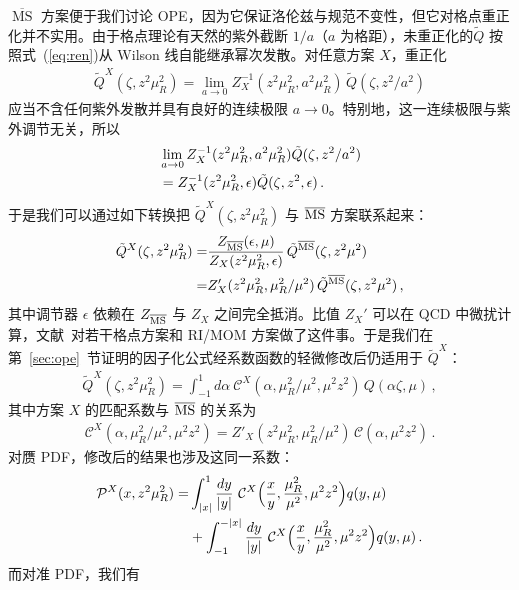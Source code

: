 $\overline{\ensuremath{\operatorname{MS}}}$ 方案便于我们讨论 OPE，因为它保证洛伦兹与规范不变性，但它对格点重正化并不实用。由于格点理论有天然的紫外截断 $1/a$（$a$ 为格距），未重正化的\spcorr $\tilde{Q}$ 按照式~(\ref{eq:ren})从 Wilson 线自能继承幂次发散。对任意方案 $X$，重正化\spcorr
\begin{align}
\tilde{Q}^X(\zeta,z^2\mu^2_R)
  = \lim_{a\to0} Z^{-1}_X(z^2\mu_R^2,a^2\mu^2_R)\, \tilde{Q}(\zeta,z^2/a^2)
\end{align}
应当不含任何紫外发散并具有良好的连续极限 $a\to0$。特别地，这一连续极限与紫外调节无关，所以
\begin{align}
&\lim_{a\to0} Z^{-1}_X(z^2\mu_R^2,a^2\mu^2_R)\tilde{Q}(\zeta,z^2/a^2) \nonumber\\
&= Z^{-1}_X(z^2\mu^2_R,\epsilon)\tilde{Q}(\zeta,z^2,\epsilon)\,.
\end{align}
于是我们可以通过如下转换把 $\tilde{Q}^X(\zeta,z^2\mu^2_R)$ 与 $\overline{\rm MS}$ 方案联系起来：
\begin{align}
\tilde{Q}^X(\zeta,z^2\mu^2_R) =& \frac{Z_{\overline{\rm MS}}(\epsilon,\mu)}{Z_X(z^2\mu^2_R,\epsilon)}\, \tilde{Q}^{\overline{\rm MS}}(\zeta,z^2\mu^2)\nonumber\\
=& Z'_X(z^2\mu_R^2,\mu_R^2/\mu^2)\, \tilde{Q}^{\overline{\rm MS}}(\zeta,z^2\mu^2)\,,
\end{align}
其中调节器 $\epsilon$ 依赖在 $Z_{\overline{\rm MS}}$ 与 $Z_X$ 之间完全抵消。比值 $Z_X'$ 可以在 QCD 中微扰计算，文献~\cite{Constantinou:2017sej}对若干格点方案和 RI/MOM 方案做了这件事。于是我们在第~\ref{sec:ope}~节证明的因子化公式经系数函数的轻微修改后仍适用于 $\tilde{Q}^X$：
\begin{align}
\tilde{Q}^X(\zeta,z^2\mu^2_R)
 = \int_{-1}^1 \!\! d\alpha \
   \mathcal{C}^X(\alpha,\mu_R^2/\mu^2,\mu^2 z^2)\, Q(\alpha\zeta,\mu)\,,
\end{align}
其中方案 $X$ 的匹配系数与 $\overline{\rm MS}$ 的关系为
\begin{align}
\mathcal{C}^X(\alpha,\mu_R^2/\mu^2,\mu^2 z^2) = Z'_X(z^2\mu_R^2,\mu_R^2/\mu^2)\, \mathcal{C}(\alpha,\mu^2 z^2) \,.
\end{align}
对赝 PDF，修改后的结果也涉及这同一系数：
\begin{align}
\mathcal{P}^X(x,z^2\mu^2_R)
=&\int_{|x|}^1 {dy\over |y|}\
 \mathcal{C}^X\Bigl({x\over y},{\mu_R^2\over \mu^2},\mu^2 z^2\Bigr) q(y,\mu)
  \\
&+\int^{-|x|}_{-1} {dy\over |y|}\
 \mathcal{C}^X\Bigl({x\over y},{\mu_R^2\over \mu^2},\mu^2 z^2\Bigr) q(y,\mu)
 \,. \nonumber
\end{align}
而对准 PDF，我们有
